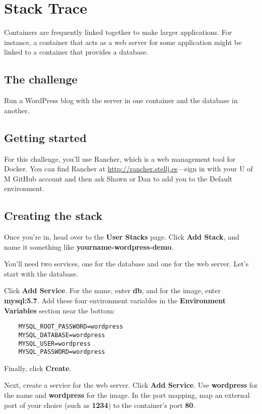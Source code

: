 \chapter*{Stack Trace}

Containers are frequently linked together to make larger applications. For instance, a container that acts as a web server for some application might be linked to a container that provides a database.

\section*{The challenge}

Run a WordPress blog with the server in one container and the database in another.

\section*{Getting started}

For this challenge, you'll use Rancher, which is a web management tool for Docker. You can find Rancher at \url{http://rancher.stellj.es}---sign in with your U of M GitHub account and then ask Shawn or Dan to add you to the Default environment.

\section*{Creating the stack}

Once you're in, head over to the \textbf{User Stacks} page. Click \textbf{Add Stack}, and name it something like \textbf{yourname-wordpress-demo}.

You'll need two services, one for the database and one for the web server. Let's start with the database.

Click \textbf{Add Service}. For the name, enter \textbf{db}, and for the image, enter \textbf{mysql:5.7}. Add these four environment variables in the \textbf{Environment Variables} section near the bottom:

\begin{verbatim}
    MYSQL_ROOT_PASSWORD=wordpress
    MYSQL_DATABASE=wordpress
    MYSQL_USER=wordpress
    MYSQL_PASSWORD=wordpress
\end{verbatim}

Finally, click \textbf{Create}.

Next, create a service for the web server. Click \textbf{Add Service}. Use \textbf{wordpress} for the name and \textbf{wordpress} for the image. In the port mapping, map an external port of your choice (such as \textbf{1234}) to the container's port \textbf{80}.

